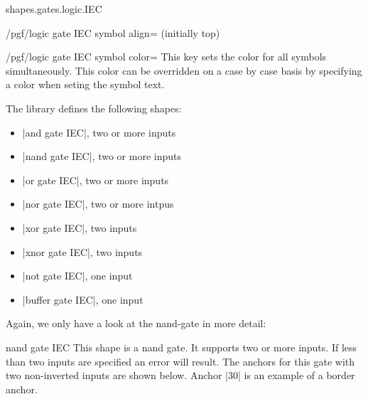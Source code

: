 \begin{pgflibrary}{shapes.gates.logic.IEC}
\begin{key}{/pgf/logic gate IEC symbol align= (initially top)}
\end{key}


\begin{key}{/pgf/logic gate IEC symbol color=}
  This key sets the color for all symbols simultaneously. This color
  can be overridden on a case by case basis by specifying a color
  when seting the symbol text.
\end{key}

  The library defines the following shapes:
  \begin{itemize}
  \item |and gate IEC|, two or more inputs
  \item |nand gate IEC|, two or more inputs
  \item |or gate IEC|, two or more inputs
  \item |nor gate IEC|, two or more intpus
  \item |xor gate IEC|, two inputs
  \item |xnor gate IEC|, two inputs
  \item |not gate IEC|, one input
  \item |buffer gate IEC|, one input
  \end{itemize}

  Again, we only have a look at the nand-gate in more detail:

\begin{shape}{nand gate IEC}
  This shape is a nand gate. It supports two or more inputs.
  If less than two inputs are specified an error will result. 
	The anchors for this gate with two
  non-inverted inputs are
  shown below. Anchor |30| is an example of a border anchor.
  
\begin{codeexample}[]
\Huge
{}
\end{codeexample}
\end{shape}
\end{pgflibrary}




